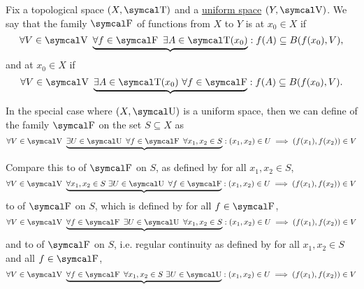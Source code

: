 \begin{Definition}\label{def:function_set_continuity}\cite[285]{Bouziad2004}
  Fix a topological space \( (X, \CT) \) and a \hyperref[def:uniform_space]{uniform space} \( (Y, \CV) \). We say that the family \( \CF \) of functions from \( X \) to \( Y \) is  at \( x_0 \in X \) if
  \begin{equation}\label{def:function_set_continuity/functionwise}
    \forall V \in \CV \ \underbrace{\forall f \in \CF \ \exists A \in \CT(x_0)} : f(A) \subseteq B(f(x_0), V),
  \end{equation}
  and  at \( x_0 \in X \) if
  \begin{equation}\label{def:function_set_continuity/equicontinuous}
    \forall V \in \CV \ \underbrace{\exists A \in \CT(x_0) \ \forall f \in \CF} : f(A) \subseteq B(f(x_0), V).
  \end{equation}

  In the special case where \( (X, \CU) \) is a uniform space, then we can define  of the family \( \CF \) on the set \( S \subseteq X \) as
  \begin{equation}\label{def:function_set_continuity/uniform_equicontinuous}
    \forall V \in \CV \ \underbrace{\exists U \in \CU \ \forall f \in \CF \ \forall x_1, x_2 \in S} : (x_1, x_2) \in U \implies (f(x_1), f(x_2)) \in V
  \end{equation}

  Compare this to  of \( \CF \) on \( S \), as defined by  for all \( x_1, x_2 \in S \),
  \begin{equation}\label{def:function_set_continuity/pointwise_equicontinuous}
    \forall V \in \CV \ \underbrace{\forall x_1, x_2 \in S \ \exists U \in \CU \ \forall f \in \CF} : (x_1, x_2) \in U \implies (f(x_1), f(x_2)) \in V
  \end{equation}
  to  of \( \CF \) on \( S \), which is defined by  for all \( f \in \CF \),
  \begin{equation}\label{def:function_set_continuity/uniform_functionwise}
    \forall V \in \CV \ \underbrace{\forall f \in \CF \ \exists U \in \CU \ \forall x_1, x_2 \in S} : (x_1, x_2) \in U \implies (f(x_1), f(x_2)) \in V
  \end{equation}
  and to  of \( \CF \) on \( S \), i.e. regular continuity as defined by  for all \( x_1, x_2 \in S \) and all \( f \in \CF \),
  \begin{equation}\label{def:function_set_continuity/functionwise_pointwise}
    \forall V \in \CV \ \underbrace{\forall f \in \CF \ \forall x_1, x_2 \in S \ \exists U \in \CU} : (x_1, x_2) \in U \implies (f(x_1), f(x_2)) \in V
  \end{equation}
\end{Definition}

